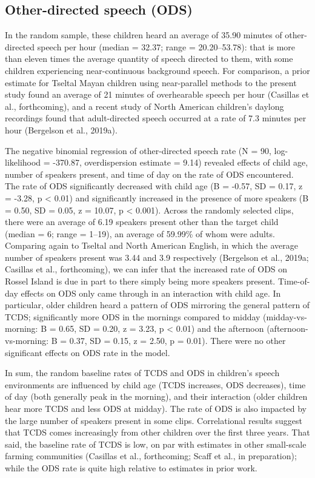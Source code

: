 \documentclass[,man,floatsintext]{apa6}
\begin{document}
\subsection{Other-directed speech
(ODS)}\label{other-directed-speech-ods}

In the random sample, these children heard an average of 35.90 minutes
of other-directed speech per hour (median = 32.37; range =
20.20--53.78): that is more than eleven times the average quantity of
speech directed to them, with some children experiencing near-continuous
background speech. For comparison, a prior estimate for Tseltal Mayan
children using near-parallel methods to the present study found an
average of 21 minutes of overhearable speech per hour (Casillas et al.,
forthcoming), and a recent study of North American children's daylong
recordings found that adult-directed speech occurred at a rate of 7.3
minutes per hour (Bergelson et al., 2019a).

The negative binomial regression of other-directed speech rate (N = 90,
log-likelihood = -370.87, overdispersion estimate = 9.14) revealed
effects of child age, number of speakers present, and time of day on the
rate of ODS encountered. The rate of ODS significantly decreased with
child age (B = -0.57, SD = 0.17, z = -3.28, p \textless{} 0.01) and
significantly increased in the presence of more speakers (B = 0.50, SD =
0.05, z = 10.07, p \textless{} 0.001). Across the randomly selected
clips, there were an average of 6.19 speakers present other than the
target child (median = 6; range = 1--19), an average of 59.99\% of whom
were adults. Comparing again to Tseltal and North American English, in
which the average number of speakers present was 3.44 and 3.9
respectively (Bergelson et al., 2019a; Casillas et al., forthcoming), we
can infer that the increased rate of ODS on Rossel Island is due in part
to there simply being more speakers present. Time-of-day effects on ODS
only came through in an interaction with child age. In particular, older
children heard a pattern of ODS mirroring the general pattern of TCDS;
significantly more ODS in the mornings compared to midday
(midday-vs-morning: B = 0.65, SD = 0.20, z = 3.23, p \textless{} 0.01)
and the afternoon (afternoon-vs-morning: B = 0.37, SD = 0.15, z = 2.50,
p = 0.01). There were no other significant effects on ODS rate in the
model.

In sum, the random baseline rates of TCDS and ODS in children's speech
environments are influenced by child age (TCDS increases, ODS
decreases), time of day (both generally peak in the morning), and their
interaction (older children hear more TCDS and less ODS at midday). The
rate of ODS is also impacted by the large number of speakers present in
some clips. Correlational results suggest that TCDS comes increasingly
from other children over the first three years. That said, the baseline
rate of TCDS is low, on par with estimates in other small-scale farming
communities (Casillas et al., forthcoming; Scaff et al., in
preparation); while the ODS rate is quite high relative to estimates in
prior work.
\end{document}
